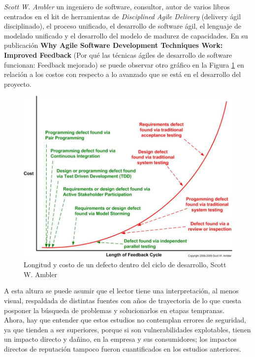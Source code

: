 \textit{Scott W. Ambler }un ingeniero de software, consultor, autor de varios libros centrados en el kit de herramientas de \textit{Disciplined Agile Delivery} (delivery ágil disciplinado), el proceso unificado, el desarrollo de software ágil, el lenguaje de modelado unificado y el desarrollo del modelo de madurez de capacidades. En su publicación \textbf{Why Agile Software Development Techniques Work: Improved Feedback}\cite{ambler2006agile} (Por qué las técnicas ágiles de desarrollo de software funcionan: Feedback mejorado) se puede observar otro gráfico en la Figura \ref{fig:comparing-techniques} en relación a los costos con respecto a lo avanzado que se está en el desarrollo del proyecto.\\

\begin{figure}[ht]
    \centering
    \includegraphics[scale=0.5]{images/ComparingTechniques.jpg}
    \caption{Longitud y costo de un defecto dentro del ciclo de desarrollo, Scott W. Ambler}
    \label{fig:comparing-techniques}
\end{figure}

A esta altura se puede asumir que el lector tiene una interpretación, al menos visual, respaldada de distintas fuentes con años de trayectoria de lo que cuesta posponer la búsqueda de problemas y solucionarlos en etapas tempranas.\\

Ahora, hay que entender que estos estudios no contemplan errores de seguridad, ya que tienden a ser superiores, porque si son vulnerabilidades explotables, tienen un impacto directo y dañino, en la empresa y sus consumidores; los impactos directos de reputación tampoco fueron cuantificados en los estudios anteriores.\\


